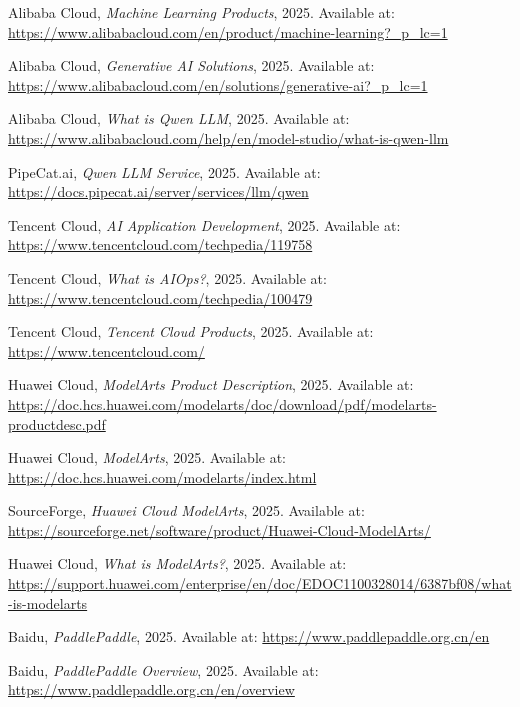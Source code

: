 \documentclass[11点, A4纸, 单面]{article}
\begin{document}
\begin{thebibliography}{99}
    Alibaba Cloud, \textit{Machine Learning Products}, 2025. Available at: \url{https://www.alibabacloud.com/en/product/machine-learning?_p_lc=1}

    Alibaba Cloud, \textit{Generative AI Solutions}, 2025. Available at: \url{https://www.alibabacloud.com/en/solutions/generative-ai?_p_lc=1}

    Alibaba Cloud, \textit{What is Qwen LLM}, 2025. Available at: \url{https://www.alibabacloud.com/help/en/model-studio/what-is-qwen-llm}

    PipeCat.ai, \textit{Qwen LLM Service}, 2025. Available at: \url{https://docs.pipecat.ai/server/services/llm/qwen}

    Tencent Cloud, \textit{AI Application Development}, 2025. Available at: \url{https://www.tencentcloud.com/techpedia/119758}

    Tencent Cloud, \textit{What is AIOps?}, 2025. Available at: \url{https://www.tencentcloud.com/techpedia/100479}

    Tencent Cloud, \textit{Tencent Cloud Products}, 2025. Available at: \url{https://www.tencentcloud.com/}

    Huawei Cloud, \textit{ModelArts Product Description}, 2025. Available at: \url{https://doc.hcs.huawei.com/modelarts/doc/download/pdf/modelarts-productdesc.pdf}

    Huawei Cloud, \textit{ModelArts}, 2025. Available at: \url{https://doc.hcs.huawei.com/modelarts/index.html}

    SourceForge, \textit{Huawei Cloud ModelArts}, 2025. Available at: \url{https://sourceforge.net/software/product/Huawei-Cloud-ModelArts/}

    Huawei Cloud, \textit{What is ModelArts?}, 2025. Available at: \url{https://support.huawei.com/enterprise/en/doc/EDOC1100328014/6387bf08/what-is-modelarts}

    Baidu, \textit{PaddlePaddle}, 2025. Available at: \url{https://www.paddlepaddle.org.cn/en}

    Baidu, \textit{PaddlePaddle Overview}, 2025. Available at: \url{https://www.paddlepaddle.org.cn/en/overview}


\end{thebibliography}
\end{document}
